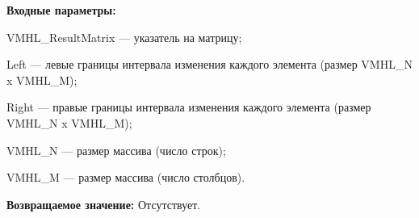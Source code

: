 \textbf{Входные параметры:}

 VMHL\_ResultMatrix --- указатель на матрицу;
 
Left --- левые границы интервала изменения каждого элемента (размер VMHL\_N x VMHL\_M);

 Right --- правые границы интервала изменения каждого элемента (размер VMHL\_N x VMHL\_M);
 
 VMHL\_N --- размер массива (число строк);
 
 VMHL\_M --- размер массива (число столбцов).

\textbf{Возвращаемое значение:}
Отсутствует.